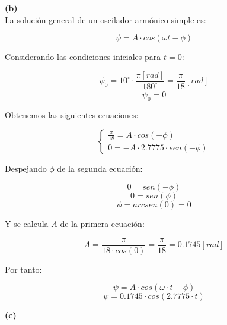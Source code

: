 \documentclass[letter,11pt]{article}
\begin{document}
\textbf{(b)} \\

La solución general de un oscilador armónico simple es:

\begin{equation*}
    \psi = A \cdot cos(\omega t - \phi)
\end{equation*}

Considerando las condiciones iniciales para $t = 0$:

\begin{equation*}
    \psi_0 = 10^\circ \cdot \frac{\pi [rad]}{180^\circ} = \frac{\pi}{18} [rad]
\end{equation*}
\begin{equation*}
    \dot{\psi_0} = 0
\end{equation*}

Obtenemos las siguientes ecuaciones:

\begin{equation}
    \begin{cases}
        \frac{\pi}{18} = A \cdot cos(- \phi) \\
        0 = -A \cdot 2.7775 \cdot sen(- \phi)
    \end{cases}
\end{equation}

Despejando $\phi$ de la segunda ecuación:

\begin{equation*}
    0 = sen(-\phi)
\end{equation*}
\begin{equation*}
    0 = sen(\phi)
\end{equation*}
\begin{equation}
    \phi = arcsen(0) = 0
\end{equation}

Y se calcula $A$ de la primera ecuación:

\begin{equation}
    A = \frac{\pi}{18 \cdot cos(0)} = \frac{\pi}{18} = 0.1745 [rad]
\end{equation}

Por tanto:

\begin{equation*}
    \psi = A \cdot cos(\omega \cdot t - \phi)
\end{equation*}
\begin{equation}
    \psi = 0.1745 \cdot cos(2.7775 \cdot t)
\end{equation}

\textbf{(c)} \\
\end{document}
